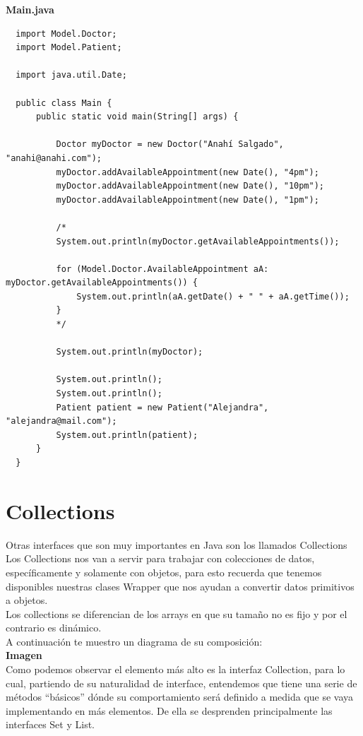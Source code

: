 \documentclass{article}
\begin{document}
\textbf{Main.java}
\begin{verbatim}
  import Model.Doctor;
  import Model.Patient;

  import java.util.Date;

  public class Main {
      public static void main(String[] args) {

          Doctor myDoctor = new Doctor("Anahí Salgado", "anahi@anahi.com");
          myDoctor.addAvailableAppointment(new Date(), "4pm");
          myDoctor.addAvailableAppointment(new Date(), "10pm");
          myDoctor.addAvailableAppointment(new Date(), "1pm");

          /*
          System.out.println(myDoctor.getAvailableAppointments());

          for (Model.Doctor.AvailableAppointment aA: myDoctor.getAvailableAppointments()) {
              System.out.println(aA.getDate() + " " + aA.getTime());
          }
          */

          System.out.println(myDoctor);

          System.out.println();
          System.out.println();
          Patient patient = new Patient("Alejandra", "alejandra@mail.com");
          System.out.println(patient);
      }
  }
\end{verbatim}




\section{Collections}%
Otras interfaces que son muy importantes en Java son los llamados Collections\\

Los Collections nos van a servir para trabajar con colecciones de datos,
específicamente y solamente con objetos, para esto recuerda que tenemos
disponibles nuestras clases Wrapper que nos ayudan a convertir datos primitivos
a objetos.\\

Los collections se diferencian de los arrays en que su tamaño no es fijo y por
el contrario es dinámico.\\

A continuación te muestro un diagrama de su composición:\\

\textbf{Imagen}\\

Como podemos observar el elemento más alto es la interfaz Collection, para lo
cual, partiendo de su naturalidad de interface, entendemos que tiene una serie
de métodos “básicos” dónde su comportamiento será definido a medida que se vaya
implementando en más elementos. De ella se desprenden principalmente las
interfaces Set y List.\\
\end{document}
